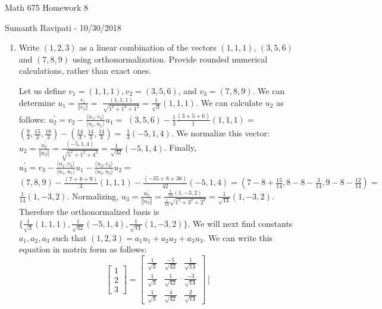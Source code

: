 \documentclass[12pt,letterpaper,reqno]{amsart}
\newcommand{\Norm}[1]{\left\Vert #1 \right \Vert}
\begin{document}
\thispagestyle{empty}
\centerline{\Large Math 675 Homework 8}
\centerline{Sumanth Ravipati - 10/30/2018}
\vspace{.25in}

\begin{enumerate}[1.]
\item Write $(1,2,3)$ as a linear combination of the vectors $(1,1,1)$, $(3,5,6)$ and $(7,8,9)$ using orthonormalization. Provide rounded numerical calculations, rather than exact ones.
\begin{flushleft}
Let us define $v_1 = (1,1,1), v_2 = (3, 5, 6)$, and $v_3 = (7, 8, 9)$. We can determine $u_1 = \frac{v_1}{\Norm{v_1}} = $ $\frac{(1,1,1)}{\sqrt{1^2+1^2+1^2}} = \frac{1}{\sqrt{3}}(1,1,1)$. We can calculate $u_2$ as follows: $u_2^\prime = v_2 - \frac{\langle u_1, v_2 \rangle}{\langle u_1, u_1 \rangle}u_1 = $ $(3, 5, 6) - \frac{1}{3}\frac{(3+5+6)}{1}(1,1,1) =$ $(\frac{9}{3}, \frac{15}{3}, \frac{18}{3}) - (\frac{14}{3}, \frac{14}{3}, \frac{14}{3}) =$ $ \frac{1}{3}(-5,1,4)$. We normalize this vector: $u_2 = \frac{u_2^\prime}{\Norm{u_2^\prime}} = \frac{(-5, 1, 4)}{\sqrt{5^2+1^2+4^2}} = \frac{1}{\sqrt{42}}(-5,1,4)$. Finally, $u_3^\prime = v_3 - \frac{\langle u_1, v_3 \rangle}{\langle u_1, u_1 \rangle}u_1 - \frac{\langle u_2, v_3 \rangle}{\langle u_2, u_2 \rangle}u_2 =$ $(7,8,9) - \frac{(7+8+9)}{3}(1,1,1) - \frac{(-35+8+36)}{42}(-5,1,4) = (7-8+\frac{15}{14}, 8-8-\frac{3}{14}, 9-8-\frac{12}{14}) =$ $\frac{1}{14}(1, -3, 2)$. Normalizing, $u_3 = \frac{u_3^\prime}{\Norm{u_3^\prime}} = \frac{\frac{1}{14}(1, -3, 2)}{\frac{1}{14}\sqrt{1^2+3^2+2^2}} = \frac{1}{\sqrt{14}}(1, -3, 2)$. Therefore the orthonormalized basis is $\{\frac{1}{\sqrt{3}}(1,1,1), \frac{1}{\sqrt{42}}(-5,1,4), \frac{1}{\sqrt{14}}(1, -3, 2)\}$. We will next find constants $a_1, a_2, a_3$ such that $(1,2,3) = a_1u_1 + a_2u_2 + a_3u_3$. We can write this equation in matrix form as follows:
$$\left[ \begin{array}{c}
    {1}\\{2}\\{3}
\end{array}\right] =
    \left[ \begin{array}{ccc}
    {\frac{1}{\sqrt{3}}} & {\frac{-5}{\sqrt{42}}} & {\frac{1}{\sqrt{14}}} \\
    {\frac{1}{\sqrt{3}}} & {\frac{1}{\sqrt{42}}} & {\frac{-3}{\sqrt{14}}} \\
    {\frac{1}{\sqrt{3}}} & {\frac{4}{\sqrt{42}}} & {\frac{2}{\sqrt{14}}}
\end{array} \right]
    \left[ \begin{array}{c}

\end{array}$$
\end{flushleft}
\end{enumerate}
\end{document}
